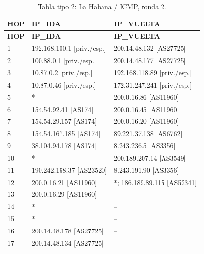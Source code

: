 \begin{longtable}{p{0.95cm}p{7.075cm}p{7.075cm}}
\caption{Tabla tipo 2: La Habana / ICMP, ronda 2.}\label{tabla2:200.14.48.134:ICMP} \\
\toprule
\textbf{HOP} & \textbf{IP\_\allowbreak{}IDA} & \textbf{IP\_\allowbreak{}VUELTA} \\ \midrule
\endfirsthead
\toprule
\textbf{HOP} & \textbf{IP\_\allowbreak{}IDA} & \textbf{IP\_\allowbreak{}VUELTA} \\ \midrule
\endhead
1 & 192.168.100.1 [priv./esp.] & 200.14.48.132 [AS27725] \\
2 & 100.88.0.1 [priv./esp.] & 200.14.48.177 [AS27725] \\
3 & 10.87.0.2 [priv./esp.] & 192.168.118.89 [priv./esp.] \\
4 & 10.87.0.46 [priv./esp.] & 172.31.247.241 [priv./esp.] \\
5 & * & 200.0.16.86 [AS11960] \\
6 & 154.54.92.41 [AS174] & 200.0.16.45 [AS11960] \\
7 & 154.54.29.157 [AS174] & 200.0.16.20 [AS11960] \\
8 & 154.54.167.185 [AS174] & 89.221.37.138 [AS6762] \\
9 & 38.104.94.178 [AS174] & 8.243.236.5 [AS3356] \\
10 & * & 200.189.207.14 [AS3549] \\
11 & 190.242.168.37 [AS23520] & 8.243.191.90 [AS3356] \\
12 & 200.0.16.21 [AS11960] & *; 186.189.89.115 [AS52341] \\
13 & 200.0.16.29 [AS11960] & -- \\
14 & * & -- \\
15 & * & -- \\
16 & 200.14.48.178 [AS27725] & -- \\
17 & 200.14.48.134 [AS27725] & -- \\
\bottomrule
\end{longtable}
\endgroup
\begingroup
\fontsize{9}{11}\selectfont
